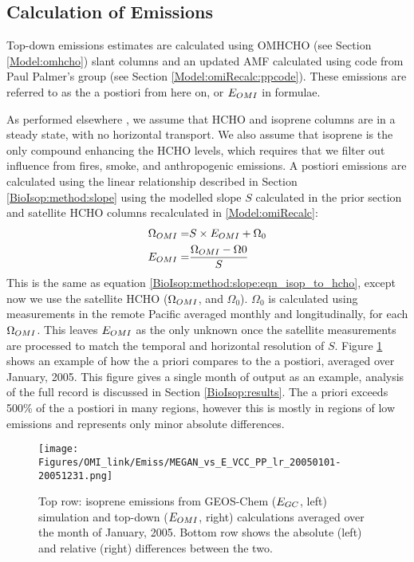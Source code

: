     
  \subsection{Calculation of Emissions}
    \label{BioIsop:method:calculation}
   
    Top-down emissions estimates are calculated using OMHCHO (see Section \ref{Model:omhcho}) slant columns and an updated AMF calculated using code from Paul Palmer's group (see Section \ref{Model:omiRecalc:ppcode}).
    These emissions are referred to as the a postiori from here on, or $E_{OMI}$ in formulae.
    
    
    As performed elsewhere \textcite[e.g.][]{Palmer2003, Millet2006, Bauwens2016}, we assume that HCHO and isoprene columns are in a steady state, with no horizontal transport.
    We also assume that isoprene is the only compound enhancing the HCHO levels, which requires that we filter out influence from fires, smoke, and anthropogenic emissions.
    A postiori emissions are calculated using the linear relationship described in Section \ref{BioIsop:method:slope} using the modelled slope $S$ calculated in the prior section and satellite HCHO columns recalculated in \ref{Model:omiRecalc}:
    \begin{eqnarray} \label{BioIsop:method:eqn_Enew}
      \Omega_{OMI} = & S \times E_{OMI} + \Omega_0 \notag \\
      E_{OMI} = & \frac{\Omega_{OMI} - \Omega{0}}{S}
    \end{eqnarray}
    This is the same as equation \ref{BioIsop:method:slope:eqn_isop_to_hcho}, except now we use the satellite HCHO ($\Omega_{OMI}$, and $\Omega_0$).
    $\Omega_0$ is calculated using measurements in the remote Pacific averaged monthly and longitudinally, for each $\Omega_{OMI}$.
    This leaves $E_{OMI}$ as the only unknown once the satellite measurements are processed to match the temporal and horizontal resolution of $S$.
    Figure \ref{BioIsop:method:calculation:fig_E_isop_200501} shows an example of how the a priori compares to the a postiori, averaged over January, 2005.
    This figure gives a single month of output as an example, analysis of the full record is discussed in Section \ref{BioIsop:results}.
    The a priori exceeds 500\% of the a postiori in many regions, however this is mostly in regions of low emissions and represents only minor absolute differences. 
    
    
    \begin{figure}
      \texttt{[image: Figures/OMI\_link/Emiss/MEGAN\_vs\_E\_VCC\_PP\_lr\_20050101-20051231.png]}
      \caption{%
        Top row: isoprene emissions from GEOS-Chem ($E_{GC}$, left) simulation and top-down ($E_{OMI}$, right) calculations averaged over the month of January, 2005.
        Bottom row shows the absolute (left) and relative (right) differences between the two.
      }
      \label{BioIsop:method:calculation:fig_E_isop_200501}
    \end{figure}
    
